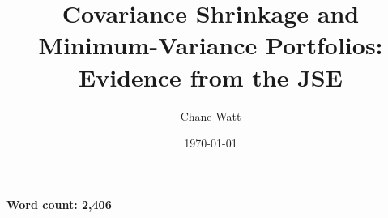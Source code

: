 \documentclass[12pt,a4paper]{article}
\title{Covariance Shrinkage and Minimum-Variance Portfolios: Evidence from the JSE}
\author{Chane Watt}
\date{\today}
\begin{document}
\maketitle

\begin{center}
\textbf{Word count: 2,406}
\end{center}













\clearpage
\printbibliography
\end{document}
